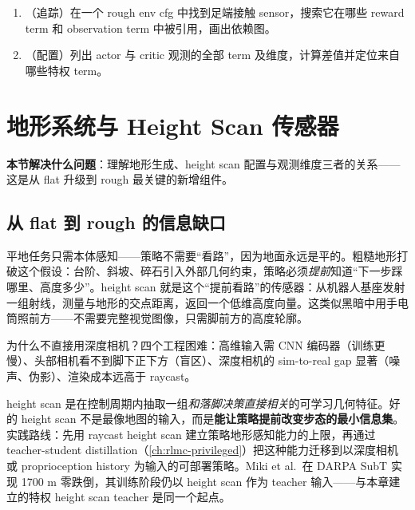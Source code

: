 \begin{practice}[链路阅读]
\begin{enumerate}
\item （追踪）在一个 rough env cfg 中找到足端接触 sensor，搜索它在哪些 reward term 和 observation term 中被引用，画出依赖图。
\item （配置）列出 actor 与 critic 观测的全部 term 及维度，计算差值并定位来自哪些特权 term。
\end{enumerate}
\end{practice}

\section{地形系统与 Height Scan 传感器}
\label{sec:rlmc-ql-terrain}

\textbf{本节解决什么问题}：理解地形生成、height scan 配置与观测维度三者的关系——这是从 flat 升级到 rough 最关键的新增组件。

\subsection{从 flat 到 rough 的信息缺口}
\label{sec:rlmc-ql-terrain-gap}

平地任务只需本体感知——策略不需要“看路”，因为地面永远是平的。粗糙地形打破这个假设：台阶、斜坡、碎石引入外部几何约束，策略必须\emph{提前}知道“下一步踩哪里、高度多少”。height scan 就是这个“提前看路”的传感器：从机器人基座发射一组射线，测量与地形的交点距离，返回一个低维高度向量。这类似黑暗中用手电筒照前方——不需要完整视觉图像，只需脚前方的高度轮廓。

为什么不直接用深度相机？四个工程困难：高维输入需 CNN 编码器（训练更慢）、头部相机看不到脚下正下方（盲区）、深度相机的 sim-to-real gap 显著（噪声、伪影）、渲染成本远高于 raycast。

\begin{insight}\label{ins:rlmc-ql-heightscan}
height scan 是在控制周期内抽取一组\emph{和落脚决策直接相关}的可学习几何特征。好的 height scan 不是最像地图的输入，而是\textbf{能让策略提前改变步态的最小信息集}。实践路线：先用 raycast height scan 建立策略地形感知能力的上限，再通过 teacher-student distillation（\cref{ch:rlmc-privileged}）把这种能力迁移到以深度相机或 proprioception history 为输入的可部署策略。Miki et al.\,\cite{miki2022perceptive} 在 DARPA SubT 实现 1700 m 零跌倒，其训练阶段仍以 height scan 作为 teacher 输入——与本章建立的特权 height scan teacher 是同一个起点。
\end{insight}

